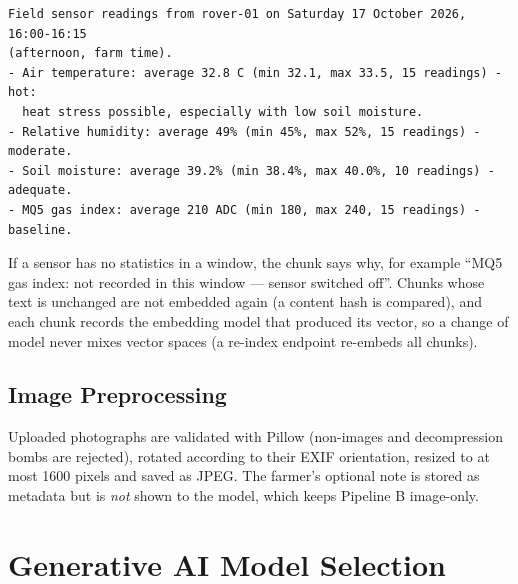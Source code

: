 \begin{lstlisting}
Field sensor readings from rover-01 on Saturday 17 October 2026, 16:00-16:15
(afternoon, farm time).
- Air temperature: average 32.8 C (min 32.1, max 33.5, 15 readings) - hot:
  heat stress possible, especially with low soil moisture.
- Relative humidity: average 49% (min 45%, max 52%, 15 readings) - moderate.
- Soil moisture: average 39.2% (min 38.4%, max 40.0%, 10 readings) - adequate.
- MQ5 gas index: average 210 ADC (min 180, max 240, 15 readings) - baseline.
\end{lstlisting}

If a sensor has no statistics in a window, the chunk says why, for example ``MQ5 gas index: not recorded in this window --- sensor
switched off''. Chunks whose text is unchanged are not embedded again (a content hash is compared), and each chunk records the
embedding model that produced its vector, so a change of model never mixes vector spaces (a re-index endpoint re-embeds all chunks).

\subsection{Image Preprocessing}

Uploaded photographs are validated with Pillow (non-images and decompression bombs are rejected), rotated according to their EXIF
orientation, resized to at most 1600 pixels and saved as JPEG. The farmer's optional note is stored as metadata but is
\emph{not} shown to the model, which keeps Pipeline B image-only.

\section{Generative AI Model Selection}

